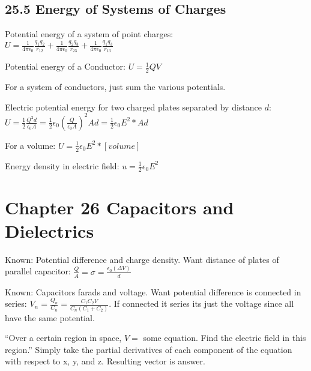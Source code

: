 \documentclass[twocolumn]{article}
\newenvironment{small_item}{
\begin{itemize}
  \setlength{\itemsep}{.25pt}
  \setlength{\parskip}{0pt}
  \setlength{\parsep}{0pt}
}{\end{itemize}}
\begin{document}
	\subsection*{25.5 Energy of Systems of Charges} %
	\label{sub:25_5_energy_of_systems_of_charges}
	
	\begin{small_item}
		\item Potential energy of a system of point charges:\\ $U = \frac{1}{4\pi\epsilon_0}\frac{q_1q_2}{r_{12}} + \frac{1}{4\pi\epsilon_0}\frac{q_2q_3}{r_{23}} + \frac{1}{4\pi\epsilon_0}\frac{q_1q_3}{r_{13}}$
		\item Potential energy of a Conductor: $U = \frac{1}{2}QV$
		\item For a system of conductors, just sum the various potentials.
		\item Electric potential energy for two charged plates separated by distance $d$: $U = \frac{1}{2}\frac{Q^2d}{\epsilon_0A} = \frac{1}{2}\epsilon_0(\frac{Q}{\epsilon_0A})^2Ad = \frac{1}{2}\epsilon_0E^2*Ad$
		\item For a volume: $U = \frac{1}{2}\epsilon_0E^2 * [volume]$
		\item Energy density in electric field: $u = \frac{1}{2}\epsilon_0E^2$
	\end{small_item}
	
	
	
	
	\section*{Chapter 26 Capacitors and Dielectrics} %
	\label{sec:chapter_26_capacitors_and_dielectrics}
	
	\begin{small_item}
		\item Known: Potential difference and charge density. Want distance of plates of parallel capacitor: $\frac{Q}{A} = \sigma = \frac{\epsilon_0(\Delta V)}{d}$
		\item Known: Capacitors farads and voltage.  Want potential difference is connected in series: $V_n = \frac{Q_n}{C_n} = \frac{C_1C_2V}{C_n(C_1+C_2)}$.  If connected it series its just the voltage since all have the same potential.
		\item ``Over a certain region in space, $V = $ some equation.  Find the electric field in this region.''  Simply take the partial derivatives of each component of the equation with respect to x, y, and z.  Resulting vector is answer.
	\end{small_item}
	
\end{document}
